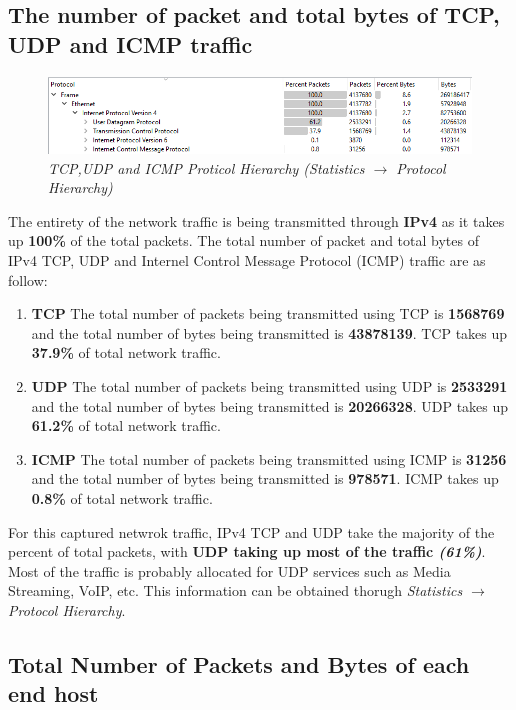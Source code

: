 \documentclass[a4paper,11pt]{article}
\begin{document}
\subsection{The number of packet and total bytes of TCP, UDP and ICMP traffic }
\begin{figure}[h!]
	\includegraphics[width = 16cm]{Traffic}
	\caption{\textit{TCP,UDP and ICMP Proticol Hierarchy (Statistics $\rightarrow$ Protocol Hierarchy)}}
\end{figure}
The entirety of the network traffic is being transmitted through \textbf{IPv4} as it takes up \textbf{100\%} of the total packets.
The total number of packet and total bytes of IPv4 TCP, UDP and Internel Control Message Protocol (ICMP) traffic are as follow:
\begin{enumerate}
	\item \textbf{TCP}
	\newline
	The total number of packets being transmitted using TCP is \textbf{1568769} and  the total number of bytes being transmitted is \textbf{43878139}.
	TCP takes up \textbf{37.9\%} of total network traffic.
	\item \textbf{UDP}
	\newline
	The total number of packets being transmitted using UDP is \textbf{2533291} and  the total number of bytes being transmitted is \textbf{20266328}. 	
	UDP takes up \textbf{61.2\%} of total network traffic.
	\item \textbf{ICMP}
	\newline
	The total number of packets being transmitted using ICMP is \textbf{31256} and  the total number of bytes being transmitted is \textbf{978571}. 	
	ICMP takes up \textbf{0.8\%} of total network traffic.
\end{enumerate}
For this captured netwrok traffic, IPv4 TCP and UDP take the majority of the percent of total packets, with \textbf{UDP taking up most of the traffic \textit{(61\%)}}. Most of the traffic is probably allocated for UDP services such as Media Streaming, VoIP, etc.
This information can be obtained thorugh \textit{Statistics $\rightarrow$ Protocol Hierarchy}.

\subsection{Total Number of Packets and Bytes of each end host}
\end{document}
